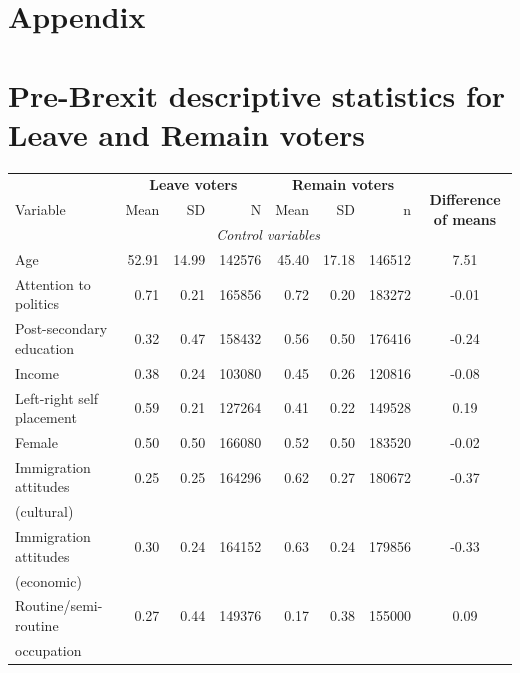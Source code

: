 \documentclass[12pt, letter]{article}
\begin{document}
\singlespacing

\newpage

\appendix

\section*{Appendix}

\section{Pre-Brexit descriptive statistics for Leave and Remain voters} \label{prebrexitdescriptives}

\begin{center}
\begin{longtable}{lrrrrrrc}
\\
& \multicolumn{3}{c}{\textbf{Leave voters}} & \multicolumn{3}{c}{\textbf{Remain voters}} & \multirow{3}{70pt}{\centering \textbf{Difference of means}}\\

 \cmidrule[1pt](lr){2-4} \cmidrule[1pt](lr){5-7}
Variable & Mean & SD & N & Mean & SD & n &\\ 

\toprule[1.5pt]
& \multicolumn{6}{c}{\textit{Control variables}} \\
  Age & 52.91 & 14.99 & 142576 & 45.40 & 17.18 & 146512 & 7.51 \\ 
  Attention to politics & 0.71 & 0.21 & 165856 & 0.72 & 0.20 & 183272 & -0.01 \\ 
  Post-secondary education & 0.32 & 0.47 & 158432 & 0.56 & 0.50 & 176416 & -0.24 \\ 
  Income & 0.38 & 0.24 & 103080 & 0.45 & 0.26 & 120816 & -0.08 \\ 
  Left-right self placement & 0.59 & 0.21 & 127264 & 0.41 & 0.22 & 149528 & 0.19 \\ 
  Female & 0.50 & 0.50 & 166080 & 0.52 & 0.50 & 183520 & -0.02 \\ 
  Immigration attitudes  & 0.25 & 0.25 & 164296 & 0.62 & 0.27 & 180672 & -0.37 \\  
    (cultural) & & & & & & & \\
  Immigration attitudes  & 0.30 & 0.24 & 164152 & 0.63 & 0.24 & 179856 & -0.33 \\ 
    (economic) & & & & & & & \\
  Routine/semi-routine & 0.27 & 0.44 & 149376 & 0.17 & 0.38 & 155000 & 0.09 \\ 
  occupation & & & & & & & \\
  

\end{longtable}
\end{center}
\end{document}
